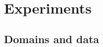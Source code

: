 \documentclass[11pt,a4paper]{article}
\DeclareMathOperator*{\argmin}{argmin}
\begin{document}


\section{Experiments \label{sec:experiments}}

\subsection{Domains and data \label{ssec:data}}
\end{document}
